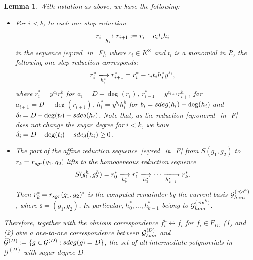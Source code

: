\documentclass{article}
\newtheorem{lemma}[theorem]{Lemma}
\theoremstyle{definition}
\theoremstyle{plain}
\theoremstyle{plain}
\theoremstyle{plain}
\theoremstyle{plain}
\numberwithin{equation}{subsection}
\begin{document}
\begin{lemma}\label{lem:cor-atD}
With notation as above, we have the following:
\begin{itemize}
\item[(1)] For $i<k$, to each one-step reduction 
\begin{equation}\label{eq:onered_in_F}
r_i\xlongrightarrow[h_i]{} r_{i+1}:=r_i-c_it_ih_i
\end{equation}
in the sequence \eqref{eq:red_in_F}, where $c_i\in K^\times$ and $t_i$ is a monomial in $R$, the following one-step reduction corresponds:
\begin{equation}\label{eq:onered_in_F^h}
r_i^*\xlongrightarrow[h_i^*]{} r_{i+1}^*=r_{i}^*-c_it_ih_i^*y^{\delta_i}, 
\end{equation} 
where $r_i^*=y^{a_i}r_i^h$ for $a_i=D-\deg(r_i)$, $r_{i+1}^*=y^{a_{i+1}}r_{i+1}^h$ for $a_{i+1}=D-\deg(r_{i+1})$, $h_i^*=y^{b_i}h_i^h$ for $b_i={\rm sdeg}(h_i)-\deg(h_i)$ and $\delta_i=D-\deg(t_i)-{\rm sdeg}(h_i)$. 
Note that, as the reduction \eqref{eq:onered_in_F} does not change the sugar degree for $i<k$, we have $\delta_i=D-\deg(t_i)-{\rm sdeg}(h_i)\geq 0$.

\item[(2)] The part of the affine reduction sequence~\eqref{eq:red_in_F} from $S(g_1,g_2)$ to $r_k=r_{\rm sgr}(g_1,g_2)$ lifts to the homogeneous reduction sequence
\begin{equation*}
{S(g^h_1,g^h_2)=r_0^*
\xlongrightarrow[h^*_0]{} r^*_1\xlongrightarrow[h^*_1]{} \cdots 
\xlongrightarrow[h^*_{k-1}]{} r^*_k}.
\end{equation*}
Then $r_k^*=r_{\rm sgr}(g_1,g_2)^*$ is the computed remainder by the {\em current} basis $\mathcal{G}_{\rm hom}^{(\prec \bm{s}^h)}$, where $\bm{s}=(g_1,g_2)$.
In particular, $h_0^*,\ldots,h_{k-1}^*$ belong to $\mathcal{G}^{(\prec \bm{s}^h)}_{\rm hom}$. 
\end{itemize}
Therefore, together with the obvious correspondence $f_i^h\leftrightarrow f_i$ for $f_i\in F_D$, (1) and (2) give a one-to-one correspondence between $\mathcal G_{\rm hom}^{(D)}$ and $\widehat{\mathcal{G}}^{(D)}:=\{g\in \mathcal{G}^{(D)} : {\rm sdeg}(g)=D\}$, the set of all intermediate polynomials in $\mathcal{G}^{(D)}$ with sugar degree $D$.
\end{lemma}
\end{document}
